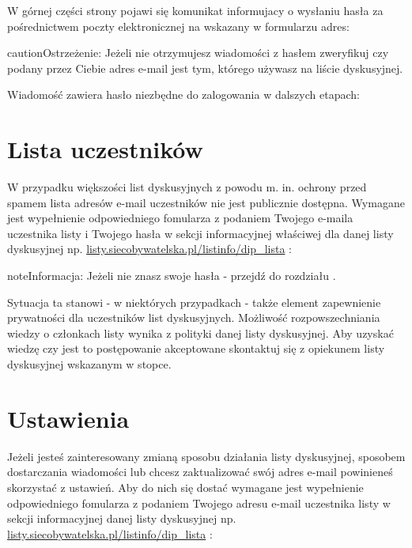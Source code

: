 \documentclass[letterpaper,10pt,polish]{sphinxmanual}
\begin{document}
\noindent{}

W górnej części strony pojawi się komunikat informujacy o wysłaniu hasła za pośrednictwem poczty elektronicznej na wskazany w formularzu adres:

\noindent{}

\begin{notice}{caution}{Ostrzeżenie:}
Jeżeli nie otrzymujesz wiadomości z hasłem zweryfikuj czy podany przez Ciebie adres e-mail jest tym, którego używasz na liście dyskusyjnej.
\end{notice}

Wiadomość zawiera hasło niezbędne do zalogowania w dalszych etapach:

\noindent{}


\section{Lista uczestników}
\label{users:lista-uczestnikow}
W przypadku większości list dyskusyjnych z powodu m. in. ochrony przed spamem lista adresów e-mail uczestników nie jest publicznie dostępna. Wymagane jest wypełnienie odpowiedniego fomularza z podaniem Twojego e-maila uczestnika listy i Twojego hasła w sekcji informacyjnej właściwej dla danej listy dyskusyjnej np. \href{https://listy.siecobywatelska.pl/listinfo/dip\_lista}{listy.siecobywatelska.pl/listinfo/dip\_lista} :

\noindent{}

\begin{notice}{note}{Informacja:}
Jeżeli nie znasz swoje hasła - przejdź do rozdziału {\hyperref[users:przypomnienie\string-hasla]{}}.
\end{notice}

Sytuacja ta stanowi - w niektórych przypadkach - także element zapewnienie prywatności dla uczestników list dyskusyjnych. Możliwość rozpowszechniania wiedzy o członkach listy wynika z polityki danej listy dyskusyjnej. Aby uzyskać wiedzę czy jest to postępowanie akceptowane skontaktuj się z opiekunem listy dyskusyjnej wskazanym w stopce.


\section{Ustawienia}
\label{users:ustawienia}
Jeżeli jesteś zainteresowany zmianą sposobu działania listy dyskusyjnej, sposobem dostarczania wiadomości lub chcesz zaktualizować swój adres e-mail powinieneś skorzystać z ustawień. Aby do nich się dostać wymagane jest wypełnienie odpowiedniego fomularza z podaniem Twojego adresu e-mail uczestnika listy w sekcji informacyjnej danej listy dyskusyjnej np. \href{https://listy.siecobywatelska.pl/listinfo/dip\_lista}{listy.siecobywatelska.pl/listinfo/dip\_lista} :
\end{document}

